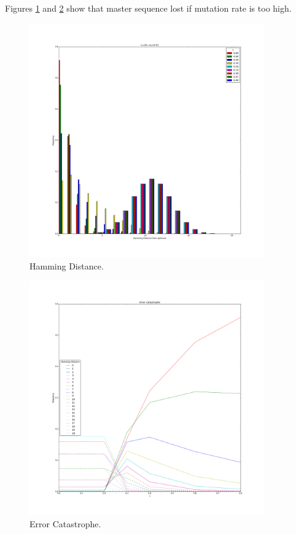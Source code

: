 \documentclass[]{article}
\begin{document}
\begin{appendices}
Figures \ref{fig:ErrorCatastrophe1} and \ref{fig:ErrorCatastrophe2} show that master sequence lost if mutation rate is too high. 
\begin{figure}[H]
	\caption{Hamming Distance.}\label{fig:ErrorCatastrophe1} 
	\includegraphics[width=0.9\textwidth]{ErrorCatastrophe1}
\end{figure}
\begin{figure}[H]
	\caption{Error Catastrophe.}\label{fig:ErrorCatastrophe2} 
	\includegraphics[width=0.9\textwidth]{ErrorCatastrophe2}
\end{figure}



\end{appendices}
\end{document}
